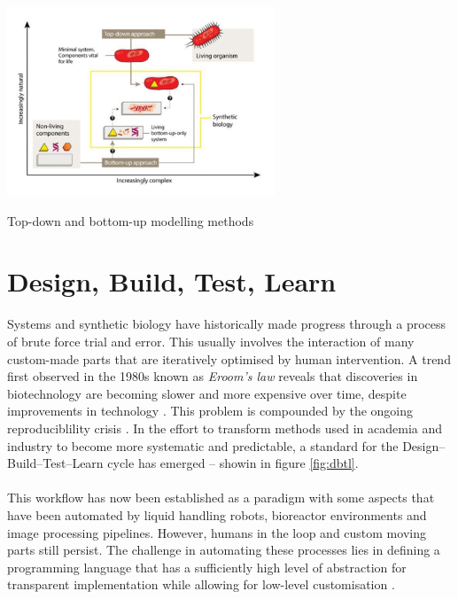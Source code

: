 \begin{Figure}
    \includegraphics[width=80mm]{figures/top-down-bottom-up.png}
    \caption{Top-down and bottom-up modelling methods}
    \label{fig:tdbu}
\end{Figure}

\section{Design, Build, Test, Learn}
Systems and synthetic biology have historically made progress through a process
of brute force trial and error. This usually involves the interaction of many
custom-made parts that are iteratively optimised by human intervention. A trend
first observed in the 1980s known as \textit{Eroom's law} reveals that discoveries
in biotechnology are becoming slower and more expensive over time, despite
improvements in technology \cite{Scannell2012DiagnosingEfficiency}.
This problem is compounded by the ongoing reproduciblility crisis \cite{Ioannidis2005WhyFalse.}.
In the effort to transform methods used in academia and industry to become more
systematic and predictable, a standard for the Design--Build--Test--Learn cycle
has emerged -- showin in figure \ref{fig:dbtl}.
\\\\
This workflow has now been established as a paradigm with some aspects that have
been automated by liquid handling robots, bioreactor environments and image processing
pipelines. However, humans in the loop and custom moving parts still persist. The challenge
in automating these processes lies in defining a programming language that has a
sufficiently high level of abstraction for transparent implementation
while allowing for low-level customisation \cite{Abate2018ExperimentalSemantics}.

